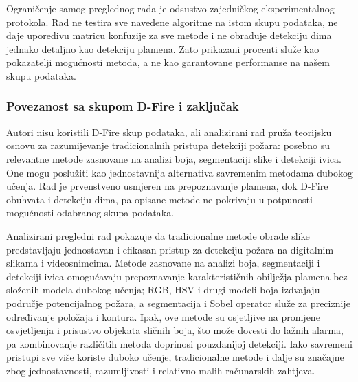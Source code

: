 Ograničenje samog preglednog rada je odsustvo zajedničkog eksperimentalnog protokola. Rad ne testira sve navedene algoritme na istom skupu podataka, ne daje uporedivu matricu konfuzije za sve metode i ne obrađuje detekciju dima jednako detaljno kao detekciju plamena. Zato prikazani procenti služe kao pokazatelji mogućnosti metoda, a ne kao garantovane performanse na našem skupu podataka.

\subsubsection{Povezanost sa skupom D-Fire i zaključak}
Autori nisu koristili D-Fire skup podataka, ali analizirani rad \cite{ahmad} pruža teorijsku osnovu za razumijevanje tradicionalnih pristupa detekciji požara: posebno su relevantne metode zasnovane na analizi boja, segmentaciji slike i detekciji ivica. One mogu poslužiti kao jednostavnija alternativa savremenim metodama dubokog učenja. Rad je prvenstveno usmjeren na prepoznavanje plamena, dok D-Fire obuhvata i detekciju dima, pa opisane metode ne pokrivaju u potpunosti mogućnosti odabranog skupa podataka.

Analizirani pregledni rad pokazuje da tradicionalne metode obrade slike predstavljaju jednostavan i efikasan pristup za detekciju požara na digitalnim slikama i videosnimcima. Metode zasnovane na analizi boja, segmentaciji i detekciji ivica omogućavaju prepoznavanje karakterističnih obilježja plamena bez složenih modela dubokog učenja; RGB, HSV i drugi modeli boja izdvajaju područje potencijalnog požara, a segmentacija i Sobel operator služe za preciznije određivanje položaja i kontura. Ipak, ove metode su osjetljive na promjene osvjetljenja i prisustvo objekata sličnih boja, što može dovesti do lažnih alarma, pa kombinovanje različitih metoda doprinosi pouzdanijoj detekciji. Iako savremeni pristupi sve više koriste duboko učenje, tradicionalne metode i dalje su značajne zbog jednostavnosti, razumljivosti i relativno malih računarskih zahtjeva.

%
\clearpage
